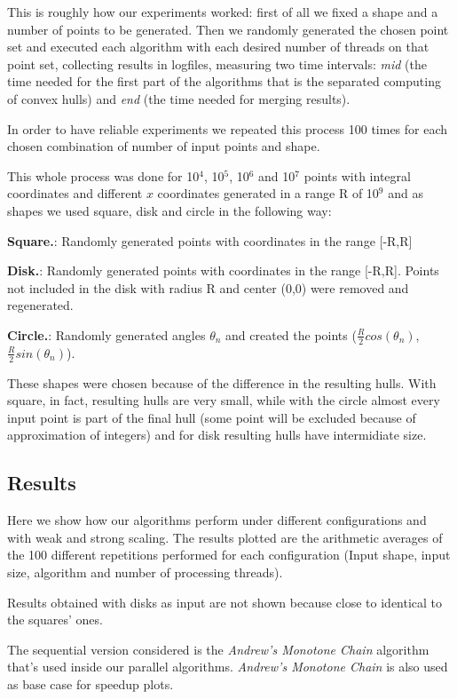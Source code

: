\documentclass[letterpaper]{article}
\newcommand{\mypar}[1]{{\bf #1.}}
\theoremstyle{definition}
\begin{document}
This is roughly how our experiments worked:
first of all we fixed a shape and a number of points to be generated. Then we randomly generated the chosen point set and executed each algorithm with each desired number of threads on that point set, collecting results in logfiles, measuring two time intervals: \textit{mid} (the time needed for the first part of the algorithms that is the separated computing of convex hulls) and \textit{end} (the time needed for merging results).

In order to have reliable experiments we repeated this process 100 times for each chosen combination of number of input points and shape.

This whole process was done for 10$^4$, 10$^5$, 10$^6$ and 10$^7$ points with integral coordinates and different $x$ coordinates generated in a range R of 10$^9$ and as shapes we used square, disk and circle in the following way:

\mypar{Square}: Randomly generated points with coordinates in the range [-R,R]

\mypar{Disk}: Randomly generated points with coordinates in the range [-R,R]. Points not included in the disk with radius R and center (0,0) were removed and regenerated.

\mypar{Circle}: Randomly generated angles $\theta_n$ and created the points ($\frac{R}{2}cos(\theta_n)$, $\frac{R}{2}sin(\theta_n)$).

These shapes were chosen because of the difference in the resulting hulls.
With square, in fact, resulting hulls are very small, while with the circle almost every input point is part of the final hull (some point will be excluded because of approximation of integers) and for disk resulting hulls have intermidiate size.

\subsection{Results}

Here we show how our algorithms perform under different configurations and with weak and strong scaling.
The results plotted are the arithmetic averages of the 100 different repetitions performed for each configuration (Input shape, input size, algorithm and number of processing threads).

Results obtained with disks as input are not shown because close to identical to the squares' ones.

The sequential version considered is the \textit{Andrew's Monotone Chain} algorithm that's used inside our parallel algorithms. \textit{Andrew's Monotone Chain} is also used as base case for speedup plots.
\end{document}
